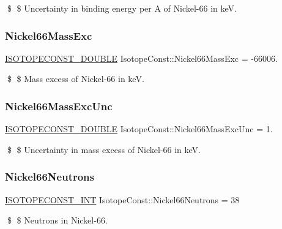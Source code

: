 \$ \$ Uncertainty in binding energy per A of Nickel-\/66 in keV. \mbox{\label{group___isotope_const-_nickel-_ni66_ga59001b78a44f658cd285128e188ae1e7}} 
\subsubsection{\texorpdfstring{Nickel66\+Mass\+Exc}{Nickel66MassExc}}
{\footnotesize\ttfamily \mbox{\hyperlink{group___isotope_const-_macros_ga8f45a7272ce02c0b4c65c44636ed719a}{I\+S\+O\+T\+O\+P\+E\+C\+O\+N\+S\+T\+\_\+\+D\+O\+U\+B\+LE}} Isotope\+Const\+::\+Nickel66\+Mass\+Exc = -\/66006.}

\$ \$ Mass excess of Nickel-\/66 in keV. \mbox{\label{group___isotope_const-_nickel-_ni66_ga846c8c675af7fc0cdd3f72cbc3ef8b7f}} 
\subsubsection{\texorpdfstring{Nickel66\+Mass\+Exc\+Unc}{Nickel66MassExcUnc}}
{\footnotesize\ttfamily \mbox{\hyperlink{group___isotope_const-_macros_ga8f45a7272ce02c0b4c65c44636ed719a}{I\+S\+O\+T\+O\+P\+E\+C\+O\+N\+S\+T\+\_\+\+D\+O\+U\+B\+LE}} Isotope\+Const\+::\+Nickel66\+Mass\+Exc\+Unc = 1.}

\$ \$ Uncertainty in mass excess of Nickel-\/66 in keV. \mbox{\label{group___isotope_const-_nickel-_ni66_gaa231b9c46aa5acb2b56353b1bcc38238}} 
\subsubsection{\texorpdfstring{Nickel66\+Neutrons}{Nickel66Neutrons}}
{\footnotesize\ttfamily \mbox{\hyperlink{group___isotope_const-_macros_ga5f18360b3e99483a35c32d789e62621c}{I\+S\+O\+T\+O\+P\+E\+C\+O\+N\+S\+T\+\_\+\+I\+NT}} Isotope\+Const\+::\+Nickel66\+Neutrons = 38}

\$ \$ Neutrons in Nickel-\/66. \mbox{\label{group___isotope_const-_nickel-_ni66_ga12dcff54dde3e76343715b88e6fbdb46}} 

